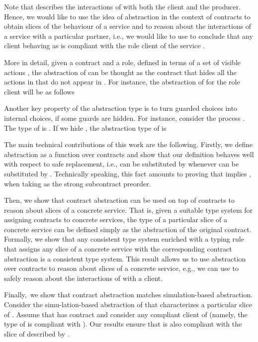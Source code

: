 \documentclass[submission,copyright,creativecommons]{eptcs}
\begin{document}
Note that  describes the interactions of  with both the client and the producer. 
Hence, we would like to use the idea of abstraction in the context of contracts to obtain
slices of the behaviour of a service and to reason about the interactions of a 
service with a particular partner, i.e., we would like to use  to conclude that 
any client behaving as  is compliant with the role 
client of the service . 

More in detail, given a contract   and a role, defined in terms of a set of visible actions , 
the abstraction  of  can be thought as the contract that hides all the actions
in  that do not
appear in . For instance, the abstraction of  for the role client will be as follows

Another key property of the abstraction type is to turn guarded choices into internal choices, if some guards are hidden. For instance, consider the process . The type of  is . If we hide , the abstraction type of  is

The main technical contributions of this work are the following. Firstly, we define abstraction as a function  over contracts and show that our definition 
behaves well with respect to safe replacement, i.e.,   can be substituted by  
whenever  can be substituted by . Technically speaking, this fact amounts to proving that 
 implies ,  when taking 
 as the strong subcontract preorder.

Then, we show that contract abstraction can be used on top of contracts to reason about
 slices of a concrete service. That is, given a suitable type system for assigning 
contracts to concrete services, the type of a particular slice of a concrete 
service can be defined simply as the abstraction of the original contract. Formally, we 
show that any consistent type system enriched with a typing rule that assigns 
any slice of a concrete service with 
the corresponding contract abstraction is a consistent type system. This result allows us 
to use abstraction over contracts to reason about slices of a concrete service, e.g., we 
can use  to safely reason about the interactions
of  with a client. 
 
Finally,\   we show that contract abstraction matches simulation-based abstraction. Consider the 
simu-lation-based abstraction  
of  that characterizes a particular slice of . Assume that  has contract  and 
consider any compliant client  of  (namely, the type of  is compliant with ). Our 
results ensure that 
 is also compliant with the slice of  described by . 
\end{document}
